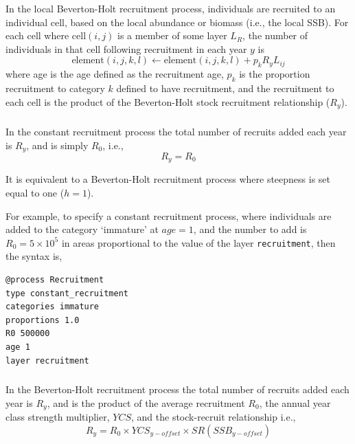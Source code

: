 In the local Beverton-Holt recruitment process, individuals are recruited to an individual cell, based on the local abundance or biomass (i.e., the local SSB). For each cell where cell$(i,j)$ is a member of some layer $L_R$, the number of individuals in that cell following recruitment in each year $y$ is 
\begin{equation}
  \text{element}(i,j,k,l) \leftarrow \text{element}(i,j,k,l) + p_k R_y L_{ij}
\end{equation}
where age is the age defined as the recruitment age, $p_k$ is the proportion recruitment to category $k$ defined to have recruitment, and the recruitment to each cell is the product of the Beverton-Holt stock recruitment relationship ($R_y$). 

\subsubsection*{}

In the constant recruitment process the total number of recruits added each year is $R_y$, and is simply $R_0$, i.e.,
\begin{equation}
  R_y = R_0
\end{equation}

It is equivalent to a Beverton-Holt recruitment process where steepness is set equal to one ($h=1$).

For example, to specify a constant recruitment process, where individuals are added to the category `immature' at $age=1$, and the number to add is $R_0=5 \times 10^5$ in areas proportional to the value of the layer \texttt{recruitment}, then the syntax is,
{\small{\begin{verbatim}
@process Recruitment
type constant_recruitment
categories immature
proportions 1.0
R0 500000
age 1
layer recruitment
\end{verbatim}}}

\subsubsection*{}

In the Beverton-Holt recruitment process the total number of recruits added each year is $R_y$, and is the product of the average recruitment $R_0$, the annual year class strength multiplier, $YCS$, and the stock-recruit relationship i.e.,
\begin{equation}
  R_y = R_0 \times YCS_{y-offset} \times SR(SSB_{y-offset})
\end{equation}
  
